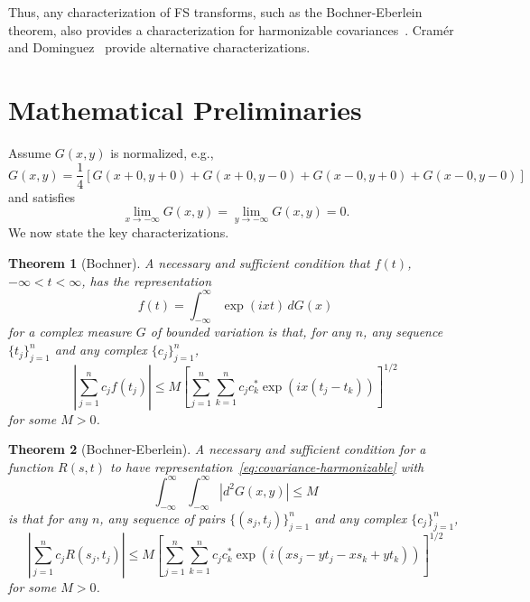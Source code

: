 \documentclass[11pt]{article}
\theoremstyle{plain}
\newtheorem{theorem}{Theorem}[section]
\theoremstyle{definition}
\theoremstyle{remark}
\begin{document}
Thus, any characterization of FS transforms, such as the Bochner-Eberlein theorem, also provides a characterization for harmonizable covariances~\cite{bochner1934fst,eberlein1955fst,rudin1962groups}. Cramér~\cite{cramer1939representation} and Dominguez~\cite{dominguez1940fst} provide alternative characterizations.

\section{Mathematical Preliminaries}

Assume $G(x,y)$ is normalized, e.g.,
\begin{equation}
G(x,y) = \frac{1}{4}\left[G(x+0, y+0) + G(x+0, y-0) + G(x-0, y+0) + G(x-0, y-0)\right]
\label{eq:G-normalization}
\end{equation}
and satisfies 
\[
\lim_{x\to -\infty} G(x, y) = \lim_{y\to -\infty} G(x, y) = 0.
\]
We now state the key characterizations.

\begin{theorem}[Bochner]
\label{thm:bochner}
A necessary and sufficient condition that $f(t)$, $-\infty < t < \infty$, has the representation
\begin{equation}
f(t) = \int_{-\infty}^{\infty} \exp(ixt) \, dG(x)
\label{eq:bochner}
\end{equation}
for a complex measure $G$ of bounded variation is that, for any $n$, any sequence $\{t_j\}_{j=1}^n$ and any complex $\{c_j\}_{j=1}^n$,
\begin{equation}
\left|\sum_{j=1}^n c_j f(t_j)\right| \leq M \left[\sum_{j=1}^n \sum_{k=1}^n c_j c_k^* \exp(ix(t_j-t_k))\right]^{1/2}
\label{eq:bochner-nnd}
\end{equation}
for some $M>0$.
\end{theorem}

\begin{theorem}[Bochner-Eberlein]
\label{thm:bochner-eberlein}
A necessary and sufficient condition for a function $R(s,t)$ to have representation~\eqref{eq:covariance-harmonizable} with
\begin{equation}
\int_{-\infty}^\infty \int_{-\infty}^\infty |d^2G(x,y)| \leq M
\label{eq:bounded-var-G}
\end{equation}
is that for any $n$, any sequence of pairs $\{(s_j,t_j)\}_{j=1}^n$ and any complex $\{c_j\}_{j=1}^n$,
\begin{equation}
\left|\sum_{j=1}^n c_j R(s_j, t_j)\right| \leq M \left[\sum_{j=1}^n \sum_{k=1}^n c_j c_k^* \exp(i(x s_j - y t_j - x s_k + y t_k))\right]^{1/2}
\label{eq:BE-nnd}
\end{equation}
for some $M > 0$.
\end{theorem}
\end{document}
